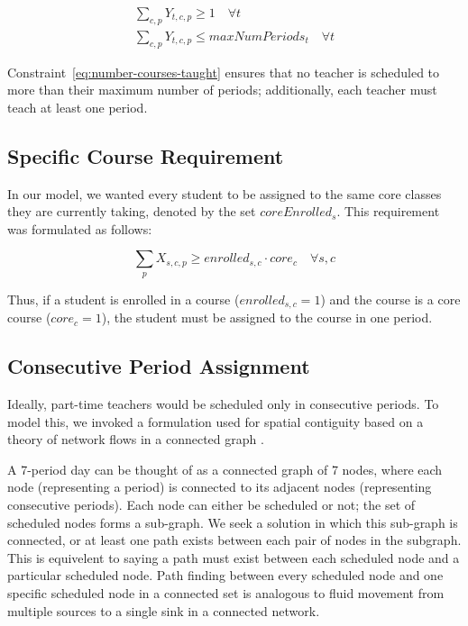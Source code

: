 \documentclass[12pt]{article}
\begin{document}
\begin{equation} \label{eq:number-courses-taught}
\begin{split}
	\displaystyle \sum_{c,p} Y_{t,c,p} \geq 1 \quad \forall t \\
	\displaystyle \sum_{c,p} Y_{t,c,p} \leq maxNumPeriods_{t} \quad \forall t
\end{split}
\end{equation}

Constraint~\ref{eq:number-courses-taught} ensures that no teacher is scheduled to more than their maximum number of periods; additionally, each teacher must teach at least one period.


\subsection{Specific Course Requirement}

In our model, we wanted every student to be assigned to the same core classes they are currently taking, denoted by the set $coreEnrolled_{s}$. This requirement was formulated as follows:

\begin{equation} \label{eq:required-core}
	\displaystyle \sum_{p} X_{s,c,p} \geq enrolled_{s,c} \cdot core_{c} \quad \forall s,c
\end{equation}

Thus, if a student is enrolled in a course ($enrolled_{s,c} = 1$) and the course is a core course ($core_{c}= 1$), the student must be assigned to the course in one period.

\subsection{Consecutive Period Assignment}

Ideally, part-time teachers would be scheduled only in consecutive periods. To model this, we invoked a formulation used for spatial contiguity based on a theory of network flows in a connected graph \cite{shirabe}.

A 7-period day can be thought of as a connected graph of 7 nodes, where each node (representing a period) is connected to its adjacent nodes (representing consecutive periods). Each node can either be scheduled or not; the set of scheduled nodes forms a sub-graph. We seek a solution in which this sub-graph is connected, or at least one path exists between each pair of nodes in the subgraph. This is equivelent to saying a path must exist between each scheduled node and a particular scheduled node. Path finding between every scheduled node and one specific scheduled node in a connected set is analogous to fluid movement from multiple sources to a single sink in a connected network.
\end{document}
